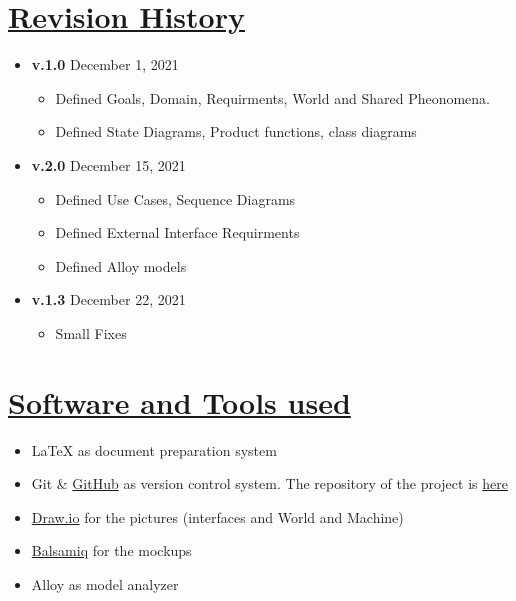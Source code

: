 \begin{appendices}
	\section[Revision History]{\hyperlink{toc}{Revision History}}
		\label{sec:revisionHistory}
		
		\begin{itemize}
			\item \textbf{v.1.0} December 1, 2021
				\begin{itemize}
					\item Defined Goals, Domain, Requirments, World and Shared Pheonomena. 
					\item Defined State Diagrams, Product functions, class diagrams
				\end{itemize}
			\item \textbf{v.2.0} December 15, 2021
				\begin{itemize}
					\item Defined Use Cases, Sequence Diagrams
					\item Defined External Interface Requirments
					\item Defined Alloy models
				\end{itemize}
			\item \textbf{v.1.3} December 22, 2021
					\begin{itemize}
						\item Small Fixes
					\end{itemize}
				\end{itemize}
	
	\section[Software and Tools used]{\hyperlink{toc}{Software and Tools used}}
		\label{sec:softwareAndTools}
		
		\begin{itemize}
			\item \LaTeX{} as document preparation system
			\item Git \& \href{https://github.com/}{GitHub} as version control system. The repository of the project is \href{https://github.com/Ma7i5ab3/SabellaDeDonatoScozzari}{here}
			\item \href{https://www.draw.io/}{Draw.io} for the pictures (interfaces and World and Machine)
			\item \href{https://balsamiq.com/}{Balsamiq} for the mockups
			\item Alloy as model analyzer
		\end{itemize}
	
\end{appendices}
